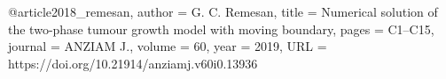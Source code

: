 @article{2018_remesan,
  author    = {G. C. Remesan},
  title     = {Numerical solution of the two-phase tumour growth model with moving boundary},
  pages     = {C1--C15},
  journal   =  {ANZIAM J.},
  volume    = {60},
  year      = {2019},
URL  = {https://doi.org/10.21914/anziamj.v60i0.13936}
}